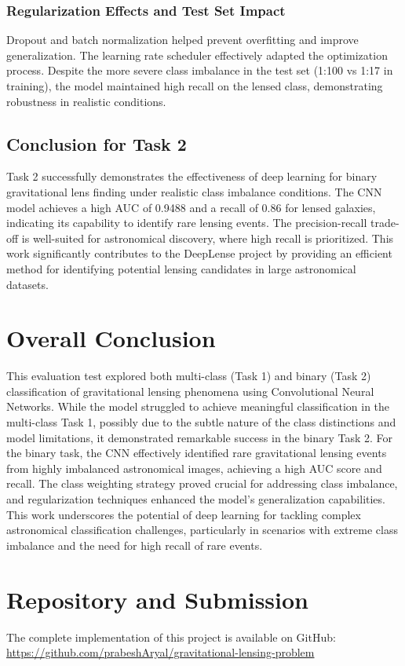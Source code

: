 \documentclass[11pt,a4paper]{article}
\begin{document}
\subsubsection{Regularization Effects and Test Set Impact}
Dropout and batch normalization helped prevent overfitting and improve generalization. The learning rate scheduler effectively adapted the optimization process.  Despite the more severe class imbalance in the test set (1:100 vs 1:17 in training), the model maintained high recall on the lensed class, demonstrating robustness in realistic conditions.

\subsection{Conclusion for Task 2}
Task 2 successfully demonstrates the effectiveness of deep learning for binary gravitational lens finding under realistic class imbalance conditions. The CNN model achieves a high AUC of 0.9488 and a recall of 0.86 for lensed galaxies, indicating its capability to identify rare lensing events. The precision-recall trade-off is well-suited for astronomical discovery, where high recall is prioritized. This work significantly contributes to the DeepLense project by providing an efficient method for identifying potential lensing candidates in large astronomical datasets.


\section{Overall Conclusion}
This evaluation test explored both multi-class (Task 1) and binary (Task 2) classification of gravitational lensing phenomena using Convolutional Neural Networks.  While the model struggled to achieve meaningful classification in the multi-class Task 1, possibly due to the subtle nature of the class distinctions and model limitations, it demonstrated remarkable success in the binary Task 2. For the binary task, the CNN effectively identified rare gravitational lensing events from highly imbalanced astronomical images, achieving a high AUC score and recall. The class weighting strategy proved crucial for addressing class imbalance, and regularization techniques enhanced the model's generalization capabilities. This work underscores the potential of deep learning for tackling complex astronomical classification challenges, particularly in scenarios with extreme class imbalance and the need for high recall of rare events.

\section{Repository and Submission}
The complete implementation of this project is available on GitHub: \url{https://github.com/prabeshAryal/gravitational-lensing-problem}
\end{document}
